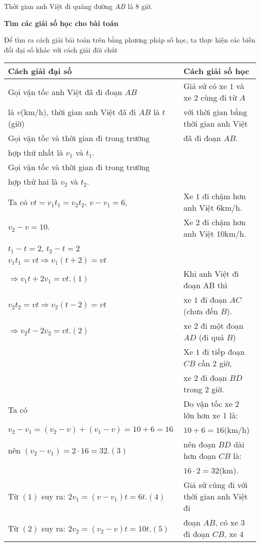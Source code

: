 Thời gian anh Việt đi quãng đường $AB$ là $8$ giờ.

\textbf{Tìm các giải số học cho bài toán}

Để tìm ra cách giải bài toán trên bằng phương pháp số học, ta thực hiện các biến đổi đại số khác với cách giải đôi chút

\begin{tabular}{|l|l|}
\hline
Cách giải đại số & Cách giải số học\\
\hline
Gọi vận tốc anh Việt đã đi đoạn $AB$ &  Giả sử có xe $1$ và xe $2$ cùng đi từ $A$ \\
là $v$(km/h), thời gian anh Việt đã đi $AB$ là $t$(giờ)&với thời gian bằng thời gian anh Việt\\
Gọi vận tốc và thời gian đi trong trường & đã đi đoạn $AB$.
\\ hợp thứ nhất là $v_1$ và $t_1$.&\\
Gọi vận tốc và thời gian đi trong trường &  \\hợp thứ hai là $v_2$ và $t_2$.&\\
\hline
Ta có $vt=v_1 t_1 = v_2 t_2$, $v-v_1=6,$ & Xe $1$ đi chậm hơn anh Việt $6$km/h.\\
$v_2 - v =10.$& Xe $2$ đi chậm hơn anh Việt $10$km/h.\\
$t_1 - t = 2$, $t_2 - t = 2$& \\
$v_1 t_1 = vt \Rightarrow v_1(t+2)=vt$& \\
$\Rightarrow v_1 t + 2 v_1 = vt.(1)$& Khi anh Việt đi đoạn AB thì\\
$v_2 t_2=vt\Rightarrow v_2(t-2)=vt$& xe $1$ đi đoạn $AC$ (chưa đến $B$).\\
$\Rightarrow v_2 t - 2 v_2 = vt.(2)$& xe $2$ đi một đoạn $AD$ (đi quá $B$)\\
& Xe $1$ đi tiếp đoạn $CB$ cần $2$ giờ,\\
& xe $2$ đi đoạn $BD$ trong $2$ giờ.\\
\hline
Ta có & Do vận tốc xe $2$ lớn hơn xe $1$ là:\\
$v_2 - v_1 = (v_2 - v)+(v_1 - v)=10+6=16$&$10+6=16$(km/h)\\
nên $(v_2 - v_1)= 2 \cdot 16 = 32. (3)$& nên đoạn $BD$ dài hơn đoạn $CB$ là:\\
& $16 \cdot 2 = 32$(km).\\
\hline
Từ $(1)$ suy ra: $2v_1 = (v- v_1)t = 6t.(4)$&Giả sử cũng đi với thời gian anh Việt đi\\
Từ $(2)$ suy ra: $2v_2=(v_2-v)t=10t.(5)$ & đoạn $AB$, có xe $3$ đi đoạn $CB$, xe $4$\\

\end{tabular}
